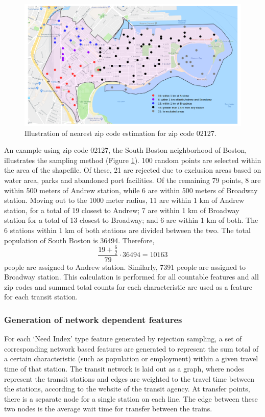 \documentclass{article}
\begin{document}
\begin{figure}[H]
\begin{center}\includegraphics[scale=0.6]{geo_point_demonstration}\end{center}\caption{Illustration of nearest zip code estimation for zip code 02127.}\label{fig:f1}
\end{figure}


An example using zip code 02127, the South Boston neighborhood of Boston, illustrates the sampling method (Figure \ref{fig:f1}). 100 random points are selected within the area of the shapefile. Of these, 21 are rejected due to exclusion areas based on water area, parks and abandoned port facilities. Of the remaining 79 points, 8 are within 500 meters of Andrew station, while 6 are within 500 meters of Broadway station. Moving out to the 1000 meter radius, 11 are within 1 km of Andrew station, for a total of 19 closest to Andrew; 7 are within 1 km of Broadway station for a total of 13 closest to Broadway; and 6 are within 1 km of both. The 6 stations within 1 km of both stations are divided between the two. The total population of South Boston is 36494. Therefore, $$\frac{19 + \frac{6}{2}}{79}\cdot{36494} = 10163$$ people are assigned to Andrew station. Similarly, 7391 people are assigned to Broadway station. This calculation is performed for all countable features and all zip codes and summed total counts for each characteristic are used as a feature for each transit station. 

\subsubsection{Generation of network dependent features}

For each `Need Index' type feature generated by rejection sampling, a set of corresponding network based features are generated to represent the sum total of a certain characteristic (such as population or employment) within a given travel time of that station. The transit network is laid out as a graph, where nodes represent the transit stations and edges are weighted to the travel time between the stations, according to the website of the transit agency. At transfer points, there is a separate node for a single station on each line. The edge between these two nodes is the average wait time for transfer between the trains. 
\end{document}
